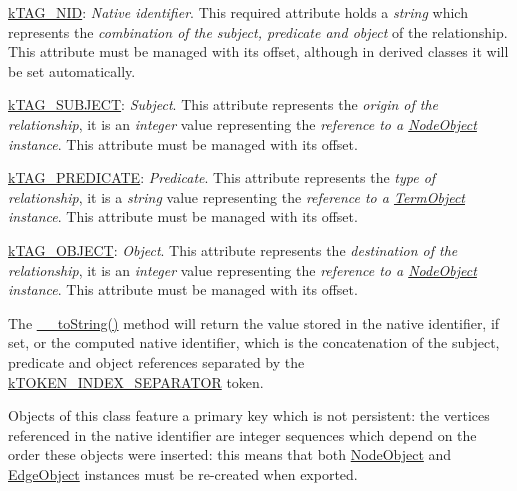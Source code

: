 \begin{DoxyItemize}
\item {\ttfamily \hyperlink{}{k\-T\-A\-G\-\_\-\-N\-I\-D}}\-: {\itshape Native identifier}. This required attribute holds a {\itshape string} which represents the {\itshape combination of the subject, predicate and object} of the relationship. This attribute must be managed with its offset, although in derived classes it will be set automatically. 
\item {\ttfamily \hyperlink{}{k\-T\-A\-G\-\_\-\-S\-U\-B\-J\-E\-C\-T}}\-: {\itshape Subject}. This attribute represents the {\itshape origin of the relationship}, it is an {\itshape integer} value representing the {\itshape reference to a \hyperlink{class_ontology_wrapper_1_1_node_object}{Node\-Object} instance}. This attribute must be managed with its offset. 
\item {\ttfamily \hyperlink{}{k\-T\-A\-G\-\_\-\-P\-R\-E\-D\-I\-C\-A\-T\-E}}\-: {\itshape Predicate}. This attribute represents the {\itshape type of relationship}, it is a {\itshape string} value representing the {\itshape reference to a \hyperlink{class_ontology_wrapper_1_1_term_object}{Term\-Object} instance}. This attribute must be managed with its offset. 
\item {\ttfamily \hyperlink{}{k\-T\-A\-G\-\_\-\-O\-B\-J\-E\-C\-T}}\-: {\itshape Object}. This attribute represents the {\itshape destination of the relationship}, it is an {\itshape integer} value representing the {\itshape reference to a \hyperlink{class_ontology_wrapper_1_1_node_object}{Node\-Object} instance}. This attribute must be managed with its offset. 
\end{DoxyItemize}

The \hyperlink{class_ontology_wrapper_1_1_edge_object_a84be7c8553b0b6b1c475e0b649a12d8c}{\-\_\-\-\_\-to\-String()} method will return the value stored in the native identifier, if set, or the computed native identifier, which is the concatenation of the subject, predicate and object references separated by the \hyperlink{}{k\-T\-O\-K\-E\-N\-\_\-\-I\-N\-D\-E\-X\-\_\-\-S\-E\-P\-A\-R\-A\-T\-O\-R} token.

Objects of this class feature a primary key which is not persistent\-: the vertices referenced in the native identifier are integer sequences which depend on the order these objects were inserted\-: this means that both \hyperlink{class_ontology_wrapper_1_1_node_object}{Node\-Object} and \hyperlink{class_ontology_wrapper_1_1_edge_object}{Edge\-Object} instances must be re-\/created when exported.

